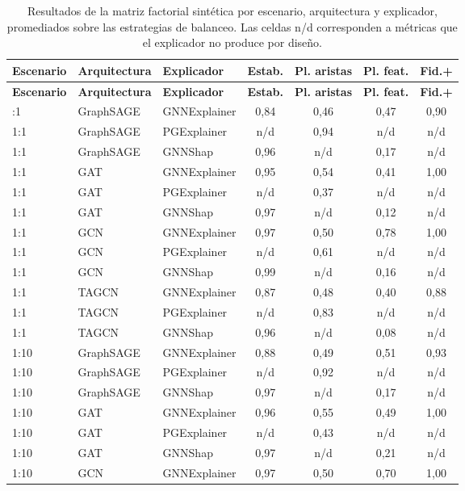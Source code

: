 \begin{longtable}{lll cccc}
\caption{Resultados de la matriz factorial sintética por escenario, arquitectura y explicador, promediados sobre las estrategias de balanceo. Las celdas n/d corresponden a métricas que el explicador no produce por diseño.}\label{tab:synth-full}\\
\toprule
\textbf{Escenario} & \textbf{Arquitectura} & \textbf{Explicador} & \textbf{Estab.} & \textbf{Pl. aristas} & \textbf{Pl. feat.} & \textbf{Fid.+} \\
\midrule
\endfirsthead
\toprule
\textbf{Escenario} & \textbf{Arquitectura} & \textbf{Explicador} & \textbf{Estab.} & \textbf{Pl. aristas} & \textbf{Pl. feat.} & \textbf{Fid.+} \\
\midrule
\endhead
\bottomrule
\endfoot
1:1 & GraphSAGE & GNNExplainer & 0,84 & 0,46 & 0,47 & 0,90 \\
1:1 & GraphSAGE & PGExplainer & n/d & 0,94 & n/d & n/d \\
1:1 & GraphSAGE & GNNShap & 0,96 & n/d & 0,17 & n/d \\
1:1 & GAT & GNNExplainer & 0,95 & 0,54 & 0,41 & 1,00 \\
1:1 & GAT & PGExplainer & n/d & 0,37 & n/d & n/d \\
1:1 & GAT & GNNShap & 0,97 & n/d & 0,12 & n/d \\
1:1 & GCN & GNNExplainer & 0,97 & 0,50 & 0,78 & 1,00 \\
1:1 & GCN & PGExplainer & n/d & 0,61 & n/d & n/d \\
1:1 & GCN & GNNShap & 0,99 & n/d & 0,16 & n/d \\
1:1 & TAGCN & GNNExplainer & 0,87 & 0,48 & 0,40 & 0,88 \\
1:1 & TAGCN & PGExplainer & n/d & 0,83 & n/d & n/d \\
1:1 & TAGCN & GNNShap & 0,96 & n/d & 0,08 & n/d \\
1:10 & GraphSAGE & GNNExplainer & 0,88 & 0,49 & 0,51 & 0,93 \\
1:10 & GraphSAGE & PGExplainer & n/d & 0,92 & n/d & n/d \\
1:10 & GraphSAGE & GNNShap & 0,97 & n/d & 0,17 & n/d \\
1:10 & GAT & GNNExplainer & 0,96 & 0,55 & 0,49 & 1,00 \\
1:10 & GAT & PGExplainer & n/d & 0,43 & n/d & n/d \\
1:10 & GAT & GNNShap & 0,97 & n/d & 0,21 & n/d \\
1:10 & GCN & GNNExplainer & 0,97 & 0,50 & 0,70 & 1,00 \\

\end{longtable}
